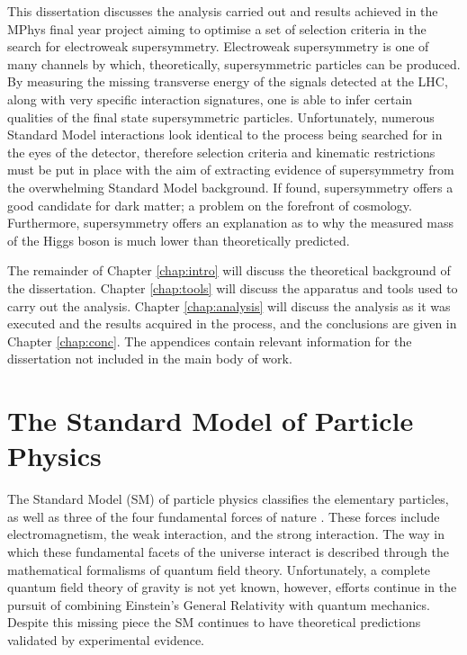 This dissertation discusses the analysis carried out and results achieved in the MPhys final year project aiming to optimise a set of selection criteria in the search for electroweak supersymmetry.
Electroweak supersymmetry is one of many channels by which, theoretically, supersymmetric particles can be produced.
By measuring the missing transverse energy of the signals detected at the LHC, along with very specific interaction signatures, one is able to infer certain qualities of the final state supersymmetric particles.
Unfortunately, numerous Standard Model interactions look identical to the process being searched for in the eyes of the detector, therefore selection criteria and kinematic restrictions must be put in place with the aim of extracting evidence of supersymmetry from the overwhelming Standard Model background.
If found, supersymmetry offers a good candidate for dark matter; a problem on the forefront of cosmology.
Furthermore, supersymmetry offers an explanation as to why the measured mass of the Higgs boson is much lower than theoretically predicted.

The remainder of Chapter \ref{chap:intro} will discuss the theoretical background of the dissertation.
Chapter \ref{chap:tools} will discuss the apparatus and tools used to carry out the analysis.
Chapter \ref{chap:analysis} will discuss the analysis as it was executed and the results acquired in the process, and the conclusions are given in Chapter \ref{chap:conc}.
The appendices contain relevant information for the dissertation not included in the main body of work.


\section{The Standard Model of Particle Physics}
The Standard Model (SM) of particle physics classifies the elementary particles, as well as three of the four fundamental forces of nature \cite{oerter2006theory}. 
These forces include electromagnetism, the weak interaction, and the strong interaction.
The way in which these fundamental facets of the universe interact is described through the mathematical formalisms of quantum field theory.
Unfortunately, a complete quantum field theory of gravity is not yet known, however, efforts continue in the pursuit of combining Einstein's General Relativity with quantum mechanics.
Despite this missing piece the SM continues to have theoretical predictions validated by experimental evidence.

